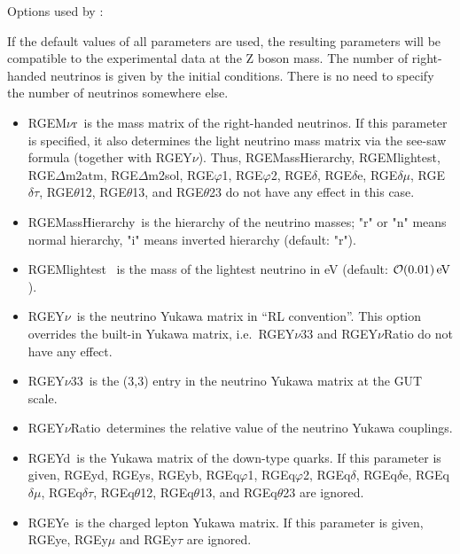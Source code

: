 \documentclass[10pt,a4paper,twoside]{scrartcl}
\begin{document}
Options used by :

If the default values of all parameters are used, the resulting parameters will
be compatible to the experimental data at the Z boson mass. The number of right-handed neutrinos is given by the initial conditions. There
is no need to specify the number of neutrinos somewhere else.
\begin{itemize}
\item RGEM$\nu$r\ is the mass matrix of the right-handed neutrinos.
  If this parameter is specified, it also determines the light neutrino
  mass matrix via the see-saw formula (together with RGEY$\nu$).  Thus,
  RGEMassHierarchy, RGEMlightest, RGE$\Delta$m2atm, RGE$\Delta$m2sol,
  RGE$\varphi$1, RGE$\varphi$2, RGE$\delta$, RGE$\delta$e,
  RGE$\delta\mu$, RGE$\delta\tau$, RGE$\theta$12, RGE$\theta$13, and
  RGE$\theta$23 do not have any effect in this case.
  
\item RGEMassHierarchy\ is the hierarchy of the neutrino masses; "r" or "n"
  means normal hierarchy, "i" means inverted hierarchy (default: "r").
  
\item RGEMlightest \ is the mass of the lightest neutrino in eV (default: $\mathcal{O}(0.01)
  \,\mathrm{eV}$).
  
\item RGEY$\nu$\ is the neutrino Yukawa matrix in ``RL convention''. This option overrides the
  built-in Yukawa matrix, i.e.\ RGEY$\nu33$ and RGEY$\nu$Ratio do not have any
  effect. 
  
\item RGEY$\nu$33\ is the (3,3) entry in the neutrino Yukawa matrix at the GUT
  scale.
\item RGEY$\nu$Ratio\ determines the relative value of the neutrino Yukawa couplings.
\item RGEYd\ is the Yukawa matrix of the down-type quarks.
  If this parameter is given, RGEyd, RGEys, RGEyb, RGEq$\varphi$1,
  RGEq$\varphi$2, RGEq$\delta$, RGEq$\delta$e, RGEq$\delta\mu$,
  RGEq$\delta\tau$, RGEq$\theta$12, RGEq$\theta$13, and RGEq$\theta$23
  are ignored.
  
\item RGEYe\ is the charged lepton Yukawa matrix.
  If this parameter is given, RGEye, RGEy$\mu$ and RGEy$\tau$ are
  ignored.
  

\end{itemize}
\end{document}
